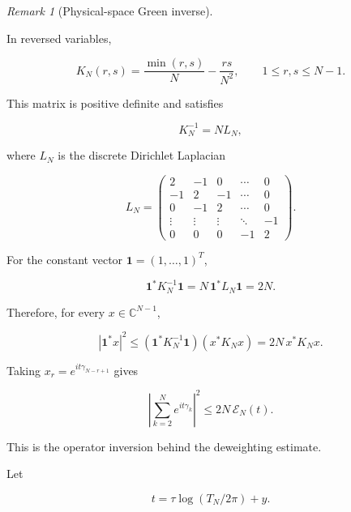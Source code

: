 \documentclass[11pt]{amsart}
\numberwithin{equation}{section}
\theoremstyle{plain}
\theoremstyle{definition}
\theoremstyle{remark}
\newtheorem{remark}[theorem]{Remark}
\begin{document}
\begin{remark}[Physical-space Green inverse]
\label{rem:physical_space_green_inverse}

In reversed variables,

\begin{equation}
K_N(r,s)
=
\frac{\min(r,s)}{N}
-
\frac{rs}{N^2},
\qquad
1\le r,s\le N-1.
\end{equation}

This matrix is positive definite and satisfies

\begin{equation}
K_N^{-1}=N L_N,
\label{eq:physical_green_inverse}
\end{equation}

where \(L_N\) is the discrete Dirichlet Laplacian

\begin{equation}
L_N=
\begin{pmatrix}
2&-1&0&\cdots&0\\
-1&2&-1&\cdots&0\\
0&-1&2&\cdots&0\\
\vdots&\vdots&\vdots&\ddots&-1\\
0&0&0&-1&2
\end{pmatrix}.
\end{equation}

For the constant vector \(\mathbf 1=(1,\ldots,1)^T\),

\begin{equation}
\mathbf 1^*K_N^{-1}\mathbf 1
=
N\,\mathbf 1^*L_N\mathbf 1
=
2N.
\end{equation}

Therefore, for every \(x\in\mathbb C^{N-1}\),

\begin{equation}
|\mathbf 1^*x|^2
\le
(\mathbf 1^*K_N^{-1}\mathbf 1)(x^*K_Nx)
=
2N\,x^*K_Nx.
\end{equation}

Taking \(x_r=e^{it\gamma_{N-r+1}}\) gives

\begin{equation}
\left|
\sum_{k=2}^{N}e^{it\gamma_k}
\right|^2
\le
2N\,\mathcal E_N(t).
\end{equation}

This is the operator inversion behind the deweighting estimate.
\end{remark}

Let

\begin{equation}
t=\tau\log(T_N/2\pi)+y.
\label{eq:deweighting_montgomery_t}
\end{equation}
\end{document}
